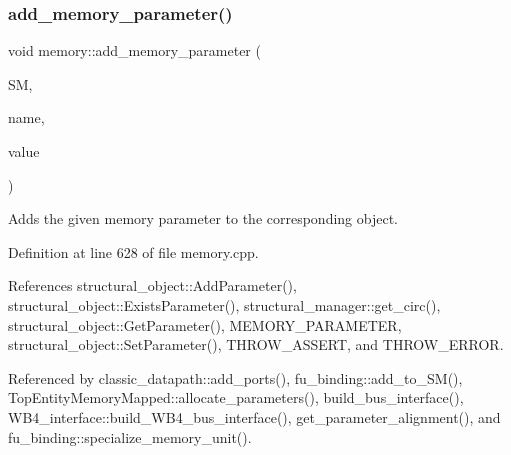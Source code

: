 \subsubsection{\texorpdfstring{add\+\_\+memory\+\_\+parameter()}{add\_memory\_parameter()}}
{\footnotesize\ttfamily void memory\+::add\+\_\+memory\+\_\+parameter (\begin{DoxyParamCaption}\item[{const \hyperlink{structural__manager_8hpp_ab3136f0e785d8535f8d252a7b53db5b5}{structural\+\_\+manager\+Ref}}]{SM,  }\item[{const std\+::string \&}]{name,  }\item[{const std\+::string \&}]{value }\end{DoxyParamCaption})\hspace{0.3cm}{\ttfamily [static]}}



Adds the given memory parameter to the corresponding object. 



Definition at line 628 of file memory.\+cpp.



References structural\+\_\+object\+::\+Add\+Parameter(), structural\+\_\+object\+::\+Exists\+Parameter(), structural\+\_\+manager\+::get\+\_\+circ(), structural\+\_\+object\+::\+Get\+Parameter(), M\+E\+M\+O\+R\+Y\+\_\+\+P\+A\+R\+A\+M\+E\+T\+ER, structural\+\_\+object\+::\+Set\+Parameter(), T\+H\+R\+O\+W\+\_\+\+A\+S\+S\+E\+RT, and T\+H\+R\+O\+W\+\_\+\+E\+R\+R\+OR.



Referenced by classic\+\_\+datapath\+::add\+\_\+ports(), fu\+\_\+binding\+::add\+\_\+to\+\_\+\+S\+M(), Top\+Entity\+Memory\+Mapped\+::allocate\+\_\+parameters(), build\+\_\+bus\+\_\+interface(), W\+B4\+\_\+interface\+::build\+\_\+\+W\+B4\+\_\+bus\+\_\+interface(), get\+\_\+parameter\+\_\+alignment(), and fu\+\_\+binding\+::specialize\+\_\+memory\+\_\+unit().

